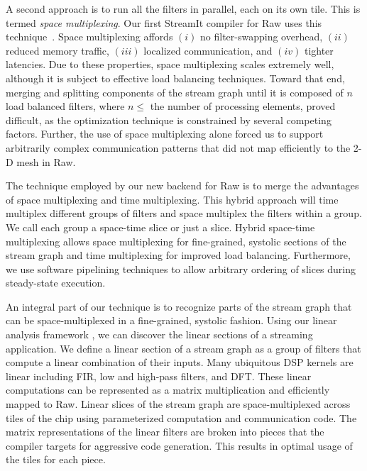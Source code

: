 \documentclass{csailabstractbook}
\begin{document}
A second approach is to run all the filters in parallel, each on its
own tile.  This is termed {\it space multiplexing}.  Our first
StreamIt compiler for Raw uses this technique~\cite{streamit-asplos}.
Space multiplexing affords $(i)$ no filter-swapping overhead, $(ii)$
reduced memory traffic, $(iii)$ localized communication, and $(iv)$
tighter latencies.  Due to these properties, space multiplexing scales
extremely well, although it is subject to effective load balancing
techniques. Toward that end, merging and splitting components of the
stream graph until it is composed of $n$ load balanced filters, where
$n \le$ the number of processing elements, proved difficult, as the
optimization technique is constrained by several competing factors.
Further, the use of space multiplexing alone forced us to support
arbitrarily complex communication patterns that did not map
efficiently to the 2-D mesh in Raw.

The technique employed by our new backend for Raw is to merge the
advantages of space multiplexing and time multiplexing.  This hybrid
approach will time multiplex different groups of filters and space
multiplex the filters within a group. We call each group a space-time
slice or just a slice.  Hybrid space-time multiplexing allows space
multiplexing for fine-grained, systolic sections of the stream graph
and time multiplexing for improved load balancing.  Furthermore, we
use software pipelining techniques to allow arbitrary ordering of
slices during steady-state execution.

An integral part of our technique is to recognize parts of the stream
graph that can be space-multiplexed in a fine-grained, systolic
fashion.  Using our linear analysis framework \cite{lamb03}, we can
discover the linear sections of a streaming application.  We define a
linear section of a stream graph as a group of filters that
compute a linear combination of their inputs.  Many ubiquitous DSP
kernels are linear including FIR, low and high-pass filters, and DFT.
These linear computations can be represented as a matrix
multiplication and efficiently mapped to Raw.  Linear slices of the
stream graph are space-multiplexed across tiles of the chip using
parameterized computation and communication code.  The matrix
representations of the linear filters are broken into pieces that the
compiler targets for aggressive code generation.  This results in
optimal usage of the tiles for each piece.
\end{document}
